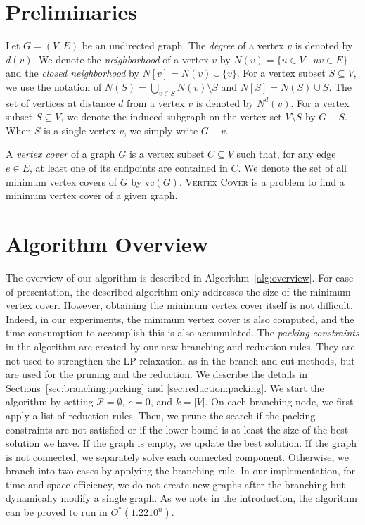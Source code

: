 \documentclass[11pt]{article}
\newcommand{\vc}{\mathrm{vc}}
\begin{document}
 \section{Preliminaries}\label{sec:preliminaries}
Let $G=(V,E)$ be an undirected graph.
The \emph{degree} of a vertex $v$ is denoted by $d(v)$.
We denote the \emph{neighborhood} of a vertex $v$ by $N(v)=\{u\in V\mid uv\in E\}$
and the \emph{closed neighborhood} by $N[v]=N(v)\cup\{v\}$.
For a vertex subset $S\subseteq V$, we use the notation of $N(S)=\bigcup_{v\in S}N(v)\setminus S$ and
$N[S]=N(S)\cup S$.
The set of vertices at distance $d$ from a vertex $v$ is denoted by $N^d(v)$.
For a vertex subset $S\subseteq V$, we denote the induced subgraph on the vertex set $V\setminus S$ by $G-S$.
When $S$ is a single vertex $v$, we simply write $G-v$.

A \emph{vertex cover} of a graph $G$ is a vertex subset $C\subseteq V$ such that, for
any edge $e\in E$, at least one of its endpoints are contained in $C$.
We denote the set of all minimum vertex covers of $G$ by $\vc(G)$.
\textsc{Vertex Cover} is a problem to find a minimum vertex cover of a given graph.
 \section{Algorithm Overview}\label{sec:overview}
The overview of our algorithm is described in Algorithm~\ref{alg:overview}.
For ease of presentation, the described algorithm only addresses the size of the minimum vertex cover.
However, obtaining the minimum vertex cover itself is not difficult.
Indeed, in our experiments, the minimum vertex cover is also computed,
and the time consumption to accomplish this is also accumulated.
The \emph{packing constraints} in the algorithm are created by our new branching and reduction rules.
They are not used to strengthen the LP relaxation, as in the branch-and-cut methods, but are used for the pruning and the
reduction.
We describe the details in Sections~\ref{sec:branching:packing} and \ref{sec:reduction:packing}.
We start the algorithm by setting $\mathcal{P}=\emptyset$, $c=0$, and $k=|V|$.
On each branching node, we first apply a list of reduction rules.
Then, we prune the search if the packing constraints are not satisfied or if the lower bound is
at least the size of the best solution we have.
If the graph is empty, we update the best solution.
If the graph is not connected, we separately solve each connected component.
Otherwise, we branch into two cases by applying the branching rule.
In our implementation, for time and space efficiency, we do not create new graphs after the branching but dynamically modify a
single graph.
As we note in the introduction, the algorithm can be proved to run in $O^*(1.2210^n)$.
\end{document}
